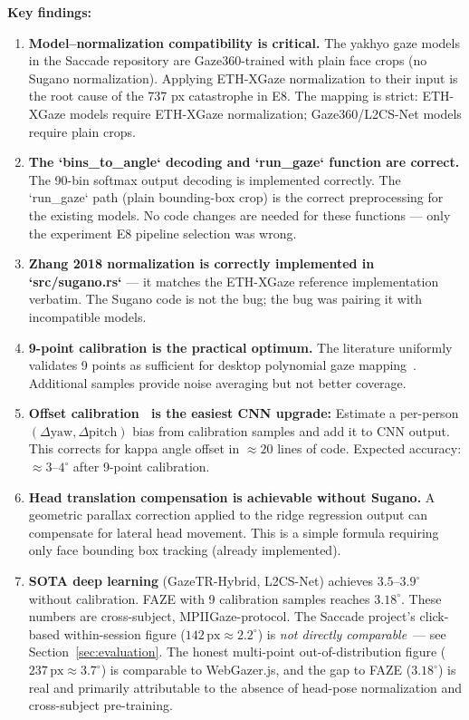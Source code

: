 \documentclass[11pt,a4paper]{article}
\begin{document}
\textbf{Key findings:}

\begin{enumerate}
  \item \textbf{Model--normalization compatibility is critical.}
  The yakhyo gaze models in the Saccade repository are Gaze360-trained with plain face crops (no Sugano normalization).
  Applying ETH-XGaze normalization to their input is the root cause of the 737 px catastrophe in E8.
  The mapping is strict: ETH-XGaze models require ETH-XGaze normalization; Gaze360/L2CS-Net models require plain crops.

  \item \textbf{The `bins\_to\_angle` decoding and `run\_gaze` function are correct.}
  The 90-bin softmax output decoding is implemented correctly.
  The `run\_gaze` path (plain bounding-box crop) is the correct preprocessing for the existing models.
  No code changes are needed for these functions --- only the experiment E8 pipeline selection was wrong.

  \item \textbf{Zhang 2018 normalization is correctly implemented in `src/sugano.rs`} ---
  it matches the ETH-XGaze reference implementation verbatim.
  The Sugano code is not the bug; the bug was pairing it with incompatible models.

  \item \textbf{9-point calibration is the practical optimum.}
  The literature uniformly validates 9 points as sufficient for desktop polynomial gaze mapping~\cite{cerrolaza2012polynomial,kar2017review}.
  Additional samples provide noise averaging but not better coverage.

  \item \textbf{Offset calibration~\cite{chen2020offset} is the easiest CNN upgrade:}
  Estimate a per-person $(\Delta\text{yaw}, \Delta\text{pitch})$ bias from calibration samples and add it to CNN output.
  This corrects for kappa angle offset in $\approx20$ lines of code.
  Expected accuracy: $\approx3$--$4^\circ$ after 9-point calibration.

  \item \textbf{Head translation compensation is achievable without Sugano.}
  A geometric parallax correction applied to the ridge regression output can compensate for lateral head movement.
  This is a simple formula requiring only face bounding box tracking (already implemented).

  \item \textbf{SOTA deep learning} (GazeTR-Hybrid, L2CS-Net) achieves $3.5$--$3.9^\circ$ without calibration.
  FAZE with 9 calibration samples reaches $3.18^\circ$.
  These numbers are cross-subject, MPIIGaze-protocol.
  The Saccade project's click-based within-session figure ($142\,\text{px} \approx 2.2^\circ$) is \textit{not directly comparable}~--- see Section~\ref{sec:evaluation}.
  The honest multi-point out-of-distribution figure ($237\,\text{px} \approx 3.7^\circ$) is comparable to WebGazer.js, and the gap to FAZE ($3.18^\circ$) is real and primarily attributable to the absence of head-pose normalization and cross-subject pre-training.


\end{enumerate}
\end{document}
